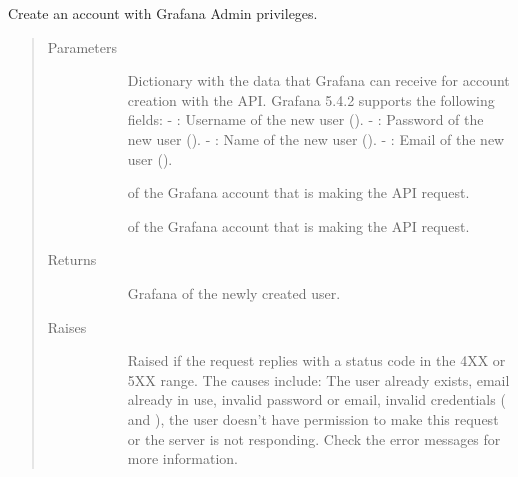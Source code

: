 \documentclass[letterpaper,10pt,english]{sphinxmanual}
\begin{document}
\begin{fulllineitems}
\label{\detokenize{grafanaAPI:grafanaAPI.createGrafanaAdmin}}
Create an account with Grafana Admin privileges.
\begin{quote}\begin{description}
\item[{Parameters}] \leavevmode\begin{description}
\item[{}] \leavevmode{[}\sphinxtitleref{dict}{]}
Dictionary with the data that Grafana can receive for account creation with
the API. Grafana 5.4.2 supports the following fields:
- : Username of the new user ().
- : Password of the new user ().
- : Name of the new user ().
- : Email of the new user ().

\item[{}] \leavevmode{[}\sphinxtitleref{str}{]}
 of the Grafana account that is making the API request.

\item[{}] \leavevmode{[}\sphinxtitleref{str}{]}
 of the Grafana account that is making the API request.

\end{description}

\item[{Returns}] \leavevmode\begin{description}
\item[{}] \leavevmode{[}\sphinxtitleref{int}{]}
Grafana  of the newly created user.

\end{description}

\item[{Raises}] \leavevmode\begin{description}
\item[{}] \leavevmode
Raised if the request replies with a status code in the 4XX or 5XX range.
The causes include: The user already exists, email already in use, invalid
password or email, invalid credentials ( and ), the user
doesn’t have permission to make this request or the server is not 
responding. Check the error messages for more information.


\end{description}
\end{description}
\end{quote}
\end{fulllineitems}
\end{document}
